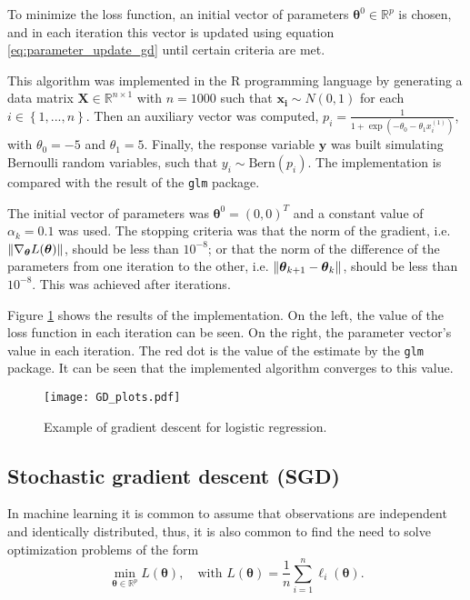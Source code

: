 To minimize the loss function, an initial vector of parameters $\boldsymbol{\theta}^0 \in \mathbb{R}^p$ is chosen, and in each iteration this vector is updated using equation \eqref{eq:parameter_update_gd} until certain criteria are met.

This algorithm was implemented in the R programming language \cite{R_manual} by generating a data matrix $\boldsymbol{X} \in \mathbb{R}^{n \times 1}$ with $n = 1000$ such that $\boldsymbol{x_i} \sim N(0, 1)$ for each $i \in \left\{1, ..., n \right\}$.
Then an auxiliary vector was computed, $p_i = \frac{1}{1 + \exp \left( - \theta_0 - \theta_1 x_i^{(1)} \right)}$, with $\theta_0 = -5$ and $\theta_1 = 5$. Finally, the response variable $\boldsymbol{y}$ was built simulating Bernoulli random variables, such that $y_i \sim \mathrm{Bern}(p_i)$.
The implementation is compared with the result of the \texttt{glm} package.

The initial vector of parameters was $\boldsymbol{\theta}^0 = (0, 0)^T$ and a constant value of $\alpha_k = 0.1$ was used. The stopping criteria was that the norm of the gradient, i.e. $\left\lVert \nabla_{\boldsymbol{\theta}} L(\boldsymbol{\theta}) \right\rVert$, should be less than $10^{-8}$; or that the norm of the difference of the parameters from one iteration to the other, i.e. $\left\lVert \boldsymbol{\theta}_{k+1} - \boldsymbol{\theta}_k \right\rVert$, should be less than $10^{-8}$. This was achieved after  iterations.

Figure \ref{fig:GD_plots} shows the results of the implementation. On the left, the value of the loss function in each iteration can be seen. On the right, the parameter vector's value in each iteration. The red dot is the value of the estimate by the \texttt{glm} package. It can be seen that the implemented algorithm converges to this value.

\begin{figure}[H]
    \centering
    \texttt{[image: GD\_plots.pdf]}
    \caption{Example of gradient descent for logistic regression.}
    \label{fig:GD_plots}
\end{figure}

\subsection{Stochastic gradient descent (SGD)}

In machine learning it is common to assume that observations are independent and identically distributed, thus, it is also common to find the need to solve optimization problems of the form
\begin{equation}
  \min_{\boldsymbol{\theta} \in \mathbb{R}^p} L(\boldsymbol{\theta}), \quad \text{with} \, \,
  L(\boldsymbol{\theta}) = \frac{1}{n} \sum_{i = 1}^n { \ell_i(\boldsymbol{\theta}) }.
\end{equation}

